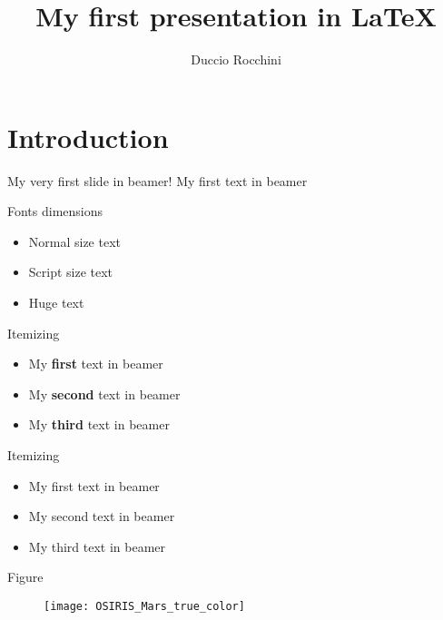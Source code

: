 \documentclass{beamer}
\title{My first presentation in LaTeX}
\author{Duccio Rocchini}
\institute{
Talk held at: \\
\bigskip
\texttt{[image: 2025-living-planet-symposium.png]}
}
\begin{document}
\maketitle


\section{Introduction}

\begin{frame}{My very first slide in beamer!}
    My first text in beamer
\end{frame}

\begin{frame}{Fonts dimensions}
    \begin{itemize}
        \item Normal size text 
        \item \scriptsize{Script size text}
        \item \huge{Huge text}
    \end{itemize}
\end{frame}


\begin{frame}{Itemizing}
    \begin{itemize}
        \item My \textbf{first} text in beamer
        \item My \textbf{second} text in beamer
        \item My \textbf{third} text in beamer
    \end{itemize}
\end{frame}

\begin{frame}{Itemizing}
    \begin{itemize}
        \item My first text in beamer
        \pause \item My second text in beamer
        \pause \item My third text in beamer
    \end{itemize}
\end{frame}

\begin{frame}{Figure}
    \begin{figure}
        \centering
        \texttt{[image: OSIRIS\_Mars\_true\_color]}
    \end{figure}
\end{frame}
\end{document}
